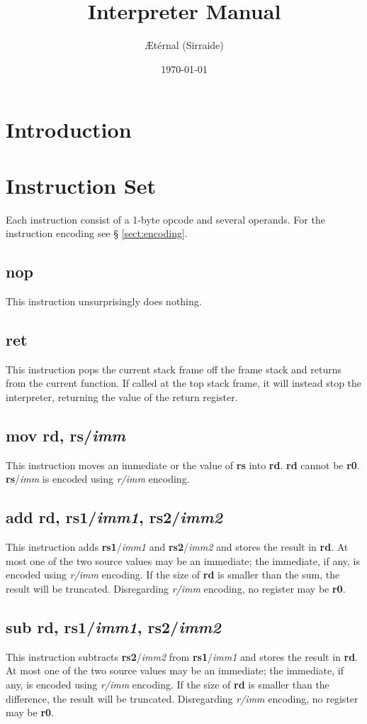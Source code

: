\documentclass[12pt, a4paper, oneside, final]{article}
\title{Interpreter Manual}
\author{Ætérnal (Sirraide)}
\date{\today}
\def\i#1{\textcolor{icolour}{\bfseries#1}}
\def\r#1{\textcolor{rcolour}{\bfseries r#1}}
\begin{document}
\maketitle\clearpage
\tableofcontents

\clearpage\section{Introduction}
\clearpage\section{Instruction Set}
Each instruction consist of a 1-byte opcode and several operands. For the instruction encoding see §
\ref{sect:encoding}.

\subsection{\i{nop}}
This instruction unsurprisingly does nothing.

\subsection{\i{ret}}
This instruction pops the current stack frame off the frame stack and returns from the current
function. If called at the top stack frame, it will instead stop the interpreter, returning the
value of the return register.

\subsection{\i{mov} \r{d}, \r{s}/\textit{imm}}
This instruction moves an immediate or the value of \r{s} into \r{d}. \r{d} cannot be \r{0}.
\r{s}/\textit{imm} is encoded using \textit{r/imm} encoding.

\subsection{\i{add} \r{d}, \r{s1}/\textit{imm1}, \r{s2}/\textit{imm2}}
This instruction adds \r{s1}/\textit{imm1} and \r{s2}/\textit{imm2} and stores the result in \r{d}.
At most one of the two source values may be an immediate; the immediate, if any, is encoded using
\textit{r/imm} encoding. If the size of \r{d} is smaller than the sum, the result will be truncated.
Disregarding \textit{r/imm} encoding, no register may be \r{0}.

\subsection{\i{sub} \r{d}, \r{s1}/\textit{imm1}, \r{s2}/\textit{imm2}}
This instruction subtracts \r{s2}/\textit{imm2} from \r{s1}/\textit{imm1} and stores the result in
\r{d}. At most one of the two source values may be an immediate; the immediate, if any, is encoded
using \textit{r/imm} encoding. If the size of \r{d} is smaller than the difference, the result will
be truncated. Disregarding \textit{r/imm} encoding, no register may be \r{0}.
\end{document}
